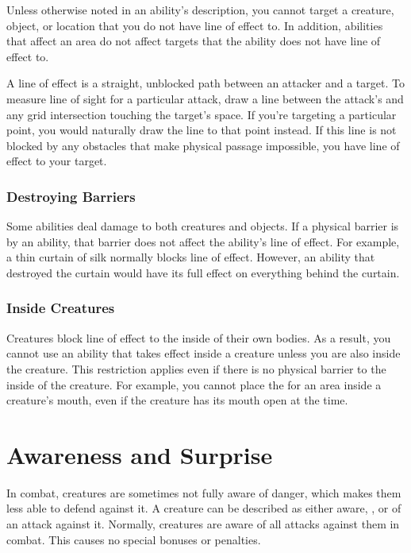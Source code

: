         Unless otherwise noted in an ability's description, you cannot target a creature, object, or location that you do not have line of effect to.
        In addition, abilities that affect an area do not affect targets that the ability does not have line of effect to.

        A line of effect is a straight, unblocked path between an attacker and a target.
        To measure line of sight for a particular attack, draw a line between the attack's  and any grid intersection touching the target's space.
        If you're targeting a particular point, you would naturally draw the line to that point instead.
        If this line is not blocked by any obstacles that make physical passage impossible, you have line of effect to your target.

        \subsubsection{Destroying Barriers}\label{Destroying Barriers}
            Some abilities deal damage to both creatures and objects.
            If a physical barrier is  by an ability, that barrier does not affect the ability's line of effect.
            For example, a thin curtain of silk normally blocks line of effect.
            However, an ability that destroyed the curtain would have its full effect on everything behind the curtain.

        \subsubsection{Inside Creatures}
            Creatures block line of effect to the inside of their own bodies.
            As a result, you cannot use an ability that takes effect inside a creature unless you are also inside the creature.
            This restriction applies even if there is no physical barrier to the inside of the creature.
            For example, you cannot place the  for an area inside a creature's mouth, even if the creature has its mouth open at the time.

\section{Awareness and Surprise}\label{Awareness and Surprise}
    In combat, creatures are sometimes not fully aware of danger, which makes them less able to defend against it.
    A creature can be described as either aware, \unaware, or \partiallyunaware of an attack against it.
    Normally, creatures are aware of all attacks against them in combat.
    This causes no special bonuses or penalties.

